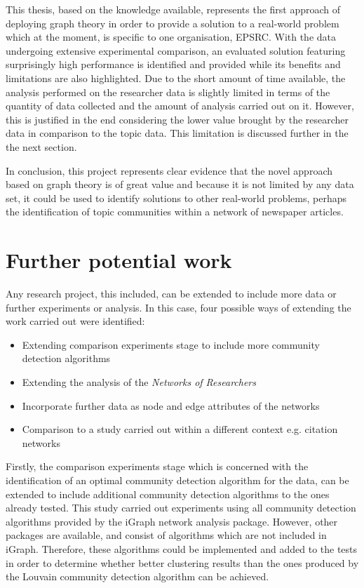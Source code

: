 This thesis, based on the knowledge available, represents the first approach of deploying graph theory in order to provide a solution to a real-world problem which at the moment, is specific to one organisation, EPSRC. With the data undergoing extensive experimental comparison, an evaluated solution featuring surprisingly high performance is identified and provided while its benefits and limitations are also highlighted. Due to the short amount of time available, the analysis performed on the researcher data is slightly limited in terms of the quantity of data collected and the amount of analysis carried out on it. However, this is justified in the end considering the lower value brought by the researcher data in comparison to the topic data. This limitation is discussed further in the the next section.

In conclusion, this project represents clear evidence that the novel approach based on graph theory is of great value and because it is not limited by any data set, it could be used to identify solutions to other real-world problems, perhaps the identification of topic communities within a network of newspaper articles.

\section{Further potential work}

Any research project, this included, can be extended to include more data or further experiments or analysis. In this case, four possible ways of extending the work carried out were identified:

\begin{itemize}[itemsep=0cm]
    \item Extending comparison experiments stage to include more community detection algorithms
    \item Extending the analysis of the \textit{Networks of Researchers}
        \item Incorporate further data as node and edge attributes of the networks
    \item Comparison to a study carried out within a different context e.g. citation networks
\end{itemize}

Firstly, the comparison experiments stage which is concerned with the identification of an optimal community detection algorithm for the data, can be extended to include additional community detection algorithms to the ones already tested. This study carried out experiments using all community detection algorithms provided by the iGraph network analysis package. However, other packages are available, and consist of algorithms which are not included in iGraph. Therefore, these algorithms could be implemented and added to the tests in order to determine whether better clustering results than the ones produced by the Louvain community detection algorithm can be achieved.

